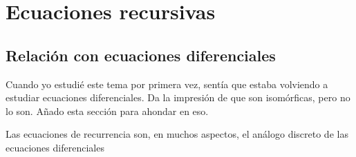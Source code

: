 \section{Ecuaciones recursivas} \label{apx:ecuaciones_recursivas}

\subsection{Relación con ecuaciones diferenciales}

\begin{author}
  Cuando yo estudié este tema por primera vez, sentía que estaba volviendo a estudiar ecuaciones diferenciales. Da la impresión de que son isomórficas, pero no lo son. Añado esta sección para ahondar en eso. 
\end{author}

Las ecuaciones de recurrencia son, en muchos aspectos, el análogo discreto de las ecuaciones diferenciales